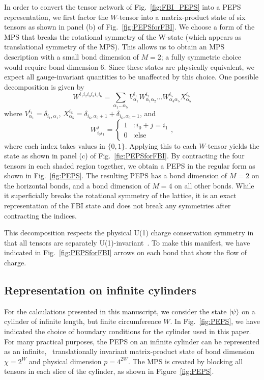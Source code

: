 In order to convert the tensor network of Fig.~\ref{fig:FBI_PEPS} into a PEPS representation,
we first factor the $W$-tensor into a matrix-product state
of six tensors as shown in panel (b) of Fig.~\ref{fig:PEPSforFBI}. We
choose a form of the MPS that breaks the rotational symmetry
of the W-state (which appears as translational symmetry of the MPS).
This allows us to obtain an MPS description with a small bond dimension
of $M=2$; a fully symmetric choice would require bond dimension 6.
Since these states are physically equivalent, we expect all
gauge-invariant quantities to be unaffected by this choice.
One possible decomposition is given by
\begin{equation}
W^{i_1 i_2 i_3 i_4 i_5 i_6} = \sum\limits_{\alpha_1 \ldots \alpha_5} V^{i_1}_{\alpha_1} W^{i_2}_{\alpha_1 \alpha_2}
\ldots
W^{i_5}_{\alpha_4 \alpha_5} X^{i_6}_{\alpha_5}
\end{equation}
where $V^{i_1}_{\alpha_1} = \delta_{i_1, \alpha_1}$, $X^{i_6}_{\alpha_5} = \delta_{i_6,\alpha_5+1}+\delta_{i_6,\alpha_5-1}$, and
\begin{equation*}
W_{i_0 i_1}^{j}  = \left\{ \begin{array}{ll}
													1  &:  i_0+j=i_1 \\
													0  &:  \text{else}
													\end{array}
											\right.,
\end{equation*}
where each index takes values in $\{0, 1\}$. Applying this to each
$W$-tensor yields the state as shown in panel (c) of
Fig.~\ref{fig:PEPSforFBI}. By contracting the four tensors in each
shaded region together, we obtain a PEPS in the regular form as shown
in Fig.~\ref{fig:PEPS}. The resulting PEPS has a bond dimension of
$M=2$ on the horizontal bonds, and a bond dimension of $M=4$ on all
other bonds. While it superficially breaks
the rotational symmetry of the lattice, it is an exact representation
of the FBI state and does not break any symmetries after contracting
the indices.

This decomposition respects the physical U(1) charge conservation
symmetry in that all tensors are separately
U(1)-invariant~\cite{bauer2011}. To make this manifest, we have
indicated in Fig.~\ref{fig:PEPSforFBI} arrows on each bond that show
the flow of charge.

\subsection{Representation on infinite cylinders}
For the calculations presented in this manuscript, we consider the
state $\vert \psi \rangle$ on a cylinder of infinite length, but finite
circumference $W$. In Fig.~\ref{fig:PEPS}, we have indicated the
choice of boundary conditions for the cylinder used in this paper. 
For many practical purposes, the PEPS on an infinite cylinder can be represented as an infinite, \
translationally invariant matrix-product state of bond dimension $\chi=2^W$
and physical dimension $p=4^{2W}$. 
The MPS is created by blocking all tensors in each slice of the cylinder, as shown in 
Figure~\ref{fig:PEPS}.

